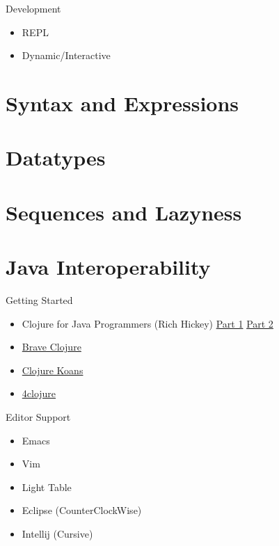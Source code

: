\documentclass[10pt, compress]{beamer}
\begin{document}
\begin{frame}{Development}
  \begin{itemize}
    \item REPL
    \item Dynamic/Interactive
  \end{itemize}
\end{frame}


\section{Syntax and Expressions}

\section{Datatypes}

\section{Sequences and Lazyness}

\section{Java Interoperability}

\begin{frame}{Getting Started}
  \begin{itemize}
    \item Clojure for Java Programmers (Rich Hickey)
      \href{https://www.youtube.com/watch?v=P76Vbsk_3J0}{Part 1}
      \href{https://www.youtube.com/watch?v=hb3rurFxrZ8}{Part 2}
    \item \href{http://www.braveclojure.com/}{Brave Clojure}
    \item \href{http://clojurekoans.com/}{Clojure Koans}
    \item \href{https://www.4clojure.com/}{4clojure}
  \end{itemize}
\end{frame}

\begin{frame}{Editor Support}
  \begin{itemize}
    \item Emacs
    \item Vim
    \item Light Table
    \item Eclipse (CounterClockWise)
    \item Intellij (Cursive)
  \end{itemize}
\end{frame}
\end{document}
